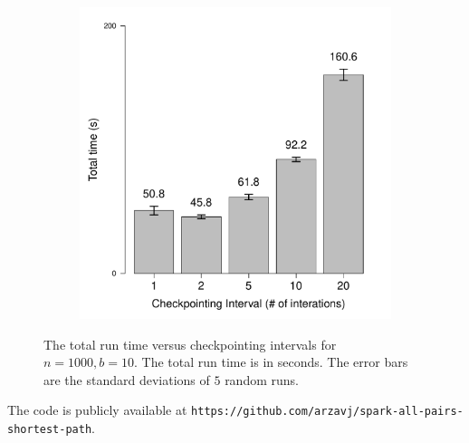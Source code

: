 \documentclass{article} %
\begin{document}
\begin{figure}[ht]
\centering
\begin{subfigure}[b]{0.45\textwidth}
\includegraphics[width = \textwidth]{timeCheckpoint.pdf}
\end{subfigure}
\caption{The total run time versus checkpointing intervals for $n = 1000, b = 10$. The total run time is in seconds. The error bars are the standard deviations of $5$ random runs.}
\label{fig:time-result-cp}
\end{figure}

The code is publicly available at {\tt https://github.com/arzavj/spark-all-pairs-shortest-path}.
\end{document}
